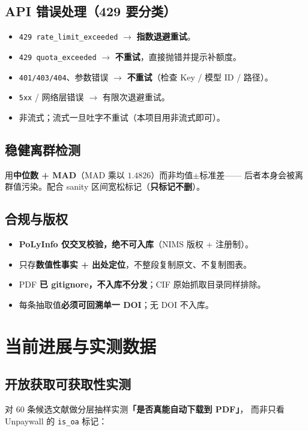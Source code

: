 \documentclass[11pt,a4paper]{ctexart}
\begin{document}
\subsection{API 错误处理（429 要分类）}
\begin{itemize}[leftmargin=1.2em]
  \item \texttt{429 rate\_limit\_exceeded} $\to$ \textbf{指数退避重试}。
  \item \texttt{429 quota\_exceeded} $\to$ \textbf{不重试}，直接抛错并提示补额度。
  \item \texttt{401/403/404}、参数错误 $\to$ \textbf{不重试}（检查 Key / 模型 ID / 路径）。
  \item \texttt{5xx} / 网络层错误 $\to$ 有限次退避重试。
  \item 非流式；流式一旦吐字不重试（本项目用非流式即可）。
\end{itemize}

\subsection{稳健离群检测}
用\textbf{中位数 + MAD}（$\mathrm{MAD}$ 乘以 $1.4826$）而非均值$\pm$标准差——
后者本身会被离群值污染。配合 sanity 区间宽松标记（\textbf{只标记不删}）。

\subsection{合规与版权}
\begin{itemize}[leftmargin=1.2em]
  \item \textbf{PoLyInfo 仅交叉校验，绝不可入库}（NIMS 版权 + 注册制）。
  \item 只存\textbf{数值性事实 + 出处定位}，不整段复制原文、不复制图表。
  \item PDF \textbf{已 gitignore，不入库不分发}；CIF 原始抓取目录同样排除。
  \item 每条抽取值\textbf{必须可回溯单一 DOI}；无 DOI 不入库。
\end{itemize}

\section{当前进展与实测数据}

\subsection{开放获取可获取性实测}
\label{sec:oa}
对 60 条候选文献做分层抽样实测\textbf{「是否真能自动下载到 PDF」}，
而非只看 Unpaywall 的 \texttt{is\_oa} 标记：
\end{document}
